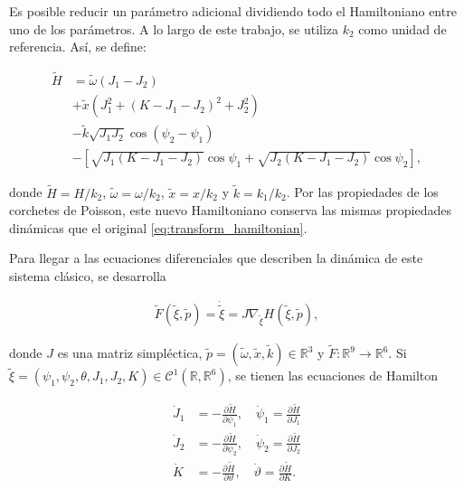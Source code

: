 Es posible reducir un parámetro adicional dividiendo todo el Hamiltoniano entre uno de los
parámetros. A lo largo de este trabajo, se utiliza $k_2$ como unidad de referencia. Así,
se define:

\begin{equation}
    \begin{split}
        \tilde{H} & = \tilde{\omega} ( J_1 - J_2 )                                                                  \\
                  & + \tilde{x} ( J_1^2 + (K - J_1 - J_2)^2 + J_2^2 )                                               \\
                  & - \tilde{k} \sqrt{J_1 J_2} \cos(\psi_2 - \psi_1)                                                \\
                  & - \left[ \sqrt{J_1 (K - J_1 - J_2)} \cos\psi_1 + \sqrt{J_2 (K - J_1 - J_2)} \cos\psi_2 \right],
    \end{split}
    \label{eq:normalize_hamiltonian}
\end{equation}

\noindent donde $ \tilde{H} = H / k_{2} $, $ \tilde{\omega} = \omega/ k_{2} $, $ \tilde{x} = x / k_{2} $
y $ \tilde{k} = k_{1} / k_{2} $. Por las propiedades de los corchetes de Poisson, este nuevo
Hamiltoniano conserva las mismas propiedades dinámicas que el original \eqref{eq:transform_hamiltonian}.

Para llegar a las ecuaciones diferenciales que describen la dinámica de este sistema clásico, se desarrolla

\begin{equation}
    \begin{split}
        \tilde{F}(\tilde{\xi}, \tilde{p}) = \dot{\tilde{\xi}} = J\nabla_{\tilde{\xi}} H (\tilde{\xi}, \tilde{p}),
    \end{split}
    \label{eq:full_differential_system}
\end{equation}

\noindent donde $ J $ es una matriz simpléctica, $\tilde{p} = (\tilde{\omega}, \tilde{x}, \tilde{k}) \in \mathbb{R}^3$ y
$\tilde{F}: \mathbb{R}^9 \rightarrow \mathbb{R}^6$. Si $ \tilde{\xi} = (\psi_1, \psi_2, \theta, J_1, J_2, K) \in
    \mathcal{C}^1(\mathbb{R}, \mathbb{R}^6)$, se tienen las ecuaciones de Hamilton

\begin{equation}
    \begin{split}
        \dot{J}_1 & = -\frac{\partial \tilde{H}}{\partial \psi_1}, \quad
        \dot{\psi}_1 = \frac{\partial \tilde{H}}{\partial J_1}              \\
        \dot{J}_2 & = -\frac{\partial \tilde{H}}{\partial \psi_2}, \quad
        \dot{\psi}_2 = \frac{\partial \tilde{H}}{\partial J_2}              \\
        \dot{K}   & = -\frac{\partial \tilde{H}}{\partial \vartheta}, \quad
        \dot{\vartheta} = \frac{\partial \tilde{H}}{\partial K}.
    \end{split}
    \label{eq:dynamical_hamilton}
\end{equation}

